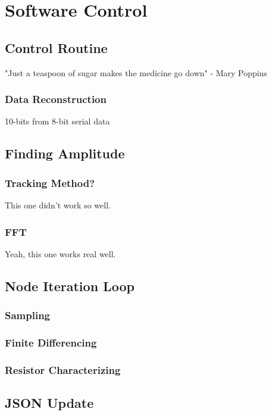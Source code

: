 \documentclass[11pt,twoside]{mitthesis}
\begin{document}
\fi

\chapter{Software Control}

\section{Control Routine}

"Just a teaspoon of sugar makes the medicine go down" - Mary Poppins



\subsection{Data Reconstruction}
10-bits from 8-bit serial data

\section{Finding Amplitude}
\subsection{Tracking Method?}
This one didn't work so well.
\subsection{FFT}
Yeah, this one works real well.

\section{Node Iteration Loop}
\subsection{Sampling}
\subsection{Finite Differencing}
\subsection{Resistor Characterizing}

\section{JSON Update}

\ifdefined\DEBUG
\end{document}
